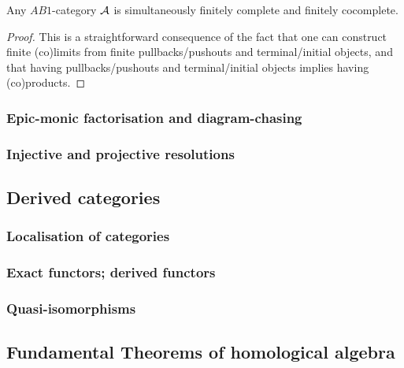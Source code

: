                 \begin{proposition} \label{prop: AB1_categories_are_finitely_(co)complete}
                    Any $AB1$-category $\mathcal{A}$ is simultaneously finitely complete and finitely cocomplete.
                \end{proposition}
                    \begin{proof}
                        This is a straightforward consequence of the fact that one can construct finite (co)limits from finite pullbacks/pushouts and terminal/initial objects, and that having pullbacks/pushouts and terminal/initial objects implies having (co)products.
                    \end{proof}
            
            \subsubsection{Epic-monic factorisation and diagram-chasing}
            
            \subsubsection{Injective and projective resolutions}
        
        \subsection{Derived categories}
            \subsubsection{Localisation of categories}
            
            \subsubsection{Exact functors; derived functors}
            
            \subsubsection{Quasi-isomorphisms}
        
        \subsection{Fundamental Theorems of homological algebra}
